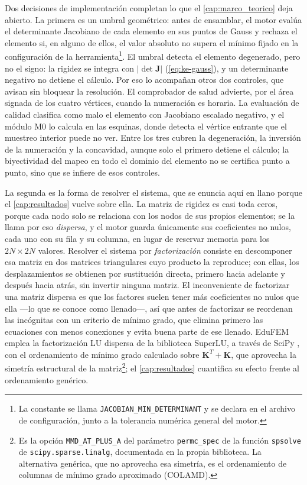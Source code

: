 Dos decisiones de implementación completan lo que el \autoref{cap:marco_teorico} deja abierto. La primera es un umbral geométrico: antes de ensamblar, el motor evalúa el determinante Jacobiano de cada elemento en sus puntos de Gauss y rechaza el elemento si, en alguno de ellos, el valor absoluto no supera el mínimo fijado en la configuración de la herramienta\footnote{La constante se llama \texttt{JACOBIAN\_MIN\_DETERMINANT} y se declara en el archivo de configuración, junto a la tolerancia numérica general del motor.}. El umbral detecta el elemento degenerado, pero no el signo: la rigidez se integra con $\lvert\det\bm{J}\rvert$ (\autoref{eq:ke-gauss}), y un determinante negativo no detiene el cálculo. Por eso lo acompañan otros dos controles, que avisan sin bloquear la resolución. El comprobador de salud advierte, por el área signada de los cuatro vértices, cuando la numeración es horaria. La evaluación de calidad clasifica como malo el elemento con Jacobiano escalado negativo, y el módulo M0 lo calcula en las esquinas, donde detecta el vértice entrante que el muestreo interior puede no ver. Entre los tres cubren la degeneración, la inversión de la numeración y la concavidad, aunque solo el primero detiene el cálculo; la biyectividad del mapeo en todo el dominio del elemento no se certifica punto a punto, sino que se infiere de esos controles.

La segunda es la forma de resolver el sistema, que se enuncia aquí en llano porque el \autoref{cap:resultados} vuelve sobre ella. La matriz de rigidez es casi toda ceros, porque cada nodo solo se relaciona con los nodos de sus propios elementos; se la llama por eso \emph{dispersa}, y el motor guarda únicamente sus coeficientes no nulos, cada uno con su fila y su columna, en lugar de reservar memoria para los $2N \times 2N$ valores. Resolver el sistema por \emph{factorización} consiste en descomponer esa matriz en dos matrices triangulares cuyo producto la reproduce; con ellas, los desplazamientos se obtienen por sustitución directa, primero hacia adelante y después hacia atrás, sin invertir ninguna matriz. El inconveniente de factorizar una matriz dispersa es que los factores suelen tener más coeficientes no nulos que ella —lo que se conoce como llenado—, así que antes de factorizar se reordenan las incógnitas con un criterio de mínimo grado, que elimina primero las ecuaciones con menos conexiones y evita buena parte de ese llenado. EduFEM emplea la factorización LU dispersa de la biblioteca SuperLU, a través de SciPy \autocite[p.~264]{virtanen2020scipy}, con el ordenamiento de mínimo grado calculado sobre $\bm{K}^{T}+\bm{K}$, que aprovecha la simetría estructural de la matriz\footnote{Es la opción \texttt{MMD\_AT\_PLUS\_A} del parámetro \texttt{permc\_spec} de la función \texttt{spsolve} de \texttt{scipy.sparse.linalg}, documentada en la propia biblioteca. La alternativa genérica, que no aprovecha esa simetría, es el ordenamiento de columnas de mínimo grado aproximado (COLAMD).}; el \autoref{cap:resultados} cuantifica su efecto frente al ordenamiento genérico.

